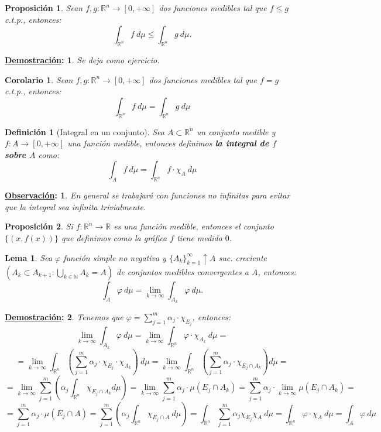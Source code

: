 \documentclass[10pt,a4paper,openright]{book}
\theoremstyle{break}
\newtheorem*{defi}{Definición}
\newtheorem*{coro}{Corolario}
\newtheorem*{lema}{Lema}
\newtheorem*{prop}{Proposición}
\newtheorem*{demo}{\underline{Demostración}:}
\newtheorem*{obs}{\underline{Observación}:}
\begin{document}
\begin{prop}
Sean $f, g: \mathbb{R}^n \rightarrow \left[0, +\infty\right]$ dos funciones medibles tal que $f \le g$ c.t.p., entonces:
$$\int_{\mathbb{R}^n}f \ d \mu \le \int_{\mathbb{R}^n}g \ d \mu.$$
\end{prop}
\begin{demo}
Se deja como ejercicio.
\end{demo}

\begin{coro}
Sean $f, g: \mathbb{R}^n \rightarrow \left[0, +\infty\right]$ dos funciones medibles tal que $f = g$ c.t.p., entonces:
$$\int_{\mathbb{R}^n}f \ d \mu = \int_{\mathbb{R}^n} g \ d \mu$$
\end{coro}

\begin{defi}[Integral en un conjunto]
Sea $A \subset \mathbb{R}^n$ un conjunto medible y $f: A \rightarrow \left[0, +\infty\right]$ una función medible, entonces definimos \textbf{la integral de $f$ sobre $A$} como:
$$\int_A f \ d \mu = \int_{\mathbb{R}^n}f \cdot \chi_{A} \ d \mu$$
\end{defi}

\begin{obs}
En general se trabajará con funciones no infinitas para evitar que la integral sea infinita trivialmente.
\end{obs}

\begin{prop}
Si $f:\mathbb{R}^n\rightarrow \mathbb{R}$ es una función medible, entonces el conjunto $\{(x, f(x))\}$ que definimos como la gráfica $f$ tiene medida $0$.
\end{prop}

\begin{lema}
Sea $\varphi$ función simple no negativa y $\{A_k\}_{k=1}^{\infty}\uparrow A$ suc. creciente $\left(A_k \subset A_{k+1} : \bigcup_{k \in \mathbb{N}} A_k = A\right)$ de conjuntos medibles convergentes a $A$, entonces:
$$\int_A \varphi \ d \mu = \lim_{k\rightarrow\infty} \int_{A_k} \varphi \ d \mu.$$
\end{lema}
\begin{demo}
Tenemos que $\varphi = \sum_{j=1}^{m} \alpha_j \cdot \chi_{E_j}$, entonces:
$$\lim_{k\rightarrow\infty} \int_{A_k} \varphi \ d \mu = \lim_{k\rightarrow\infty} \int_{\mathbb{R}^n}\varphi \cdot \chi_{A_k} \ d \mu =$$
$$= \lim_{k\rightarrow\infty} \int_{\mathbb{R}^n} \left(\sum_{j=1}^{m} \alpha_j \cdot \chi_{E_j}\cdot \chi_{A_k}\right) \ d \mu= \lim_{k\rightarrow\infty} \int_{\mathbb{R}^n} \left(\sum_{j=1}^{m} \alpha_j \cdot \chi_{E_j \cap A_k}\right) d \mu = $$
$$= \lim_{k\rightarrow\infty} \sum_{j=1}^{m} \left( \alpha_j \int_{\mathbb{R}^n} \chi_{E_j \cap A_k} d \mu \right) = \lim_{k\rightarrow\infty} \sum_{j=1}^{m} \alpha_j \cdot \mu\left(E_j \cap A_k\right) = \sum_{j=1}^{m} \alpha_j \cdot \lim_{k\rightarrow\infty} \mu\left(E_j \cap A_k\right) = $$
$$= \sum_{j=1}^{m} \alpha_j \cdot \mu\left(E_j \cap A\right) = \sum_{j=1}^{m} \left(\alpha_j \int_{\mathbb{R}^n} \chi_{E_j \cap A} \ d \mu\right) = \int_{\mathbb{R}^n}\sum_{j=1}^{m} \alpha_j \chi_{E_j} \chi_{A} \ d \mu= \int_{\mathbb{R}^n} \varphi \cdot \chi_A \ d \mu = \int_A \varphi \ d \mu$$
\end{demo}
\end{document}
